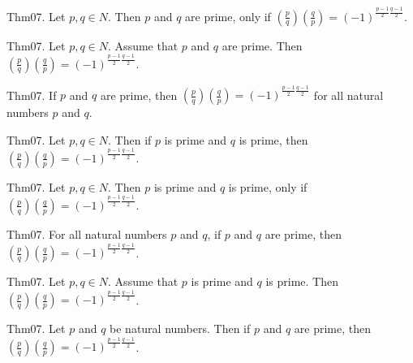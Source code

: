 \documentclass{article}
\begin{document}
Thm07. Let $p , q \in N$. Then $p$ and $q$ are prime, only if $\left(\frac{ p }{ q }\right) \left(\frac{ q }{ p }\right) = (- 1)^ {\frac{ p - 1}{2}\frac{ q - 1}{2}}$.

Thm07. Let $p , q \in N$. Assume that $p$ and $q$ are prime. Then $\left(\frac{ p }{ q }\right) \left(\frac{ q }{ p }\right) = (- 1)^ {\frac{ p - 1}{2}\frac{ q - 1}{2}}$.

Thm07. If $p$ and $q$ are prime, then $\left(\frac{ p }{ q }\right) \left(\frac{ q }{ p }\right) = (- 1)^ {\frac{ p - 1}{2}\frac{ q - 1}{2}}$ for all natural numbers $p$ and $q$.

Thm07. Let $p , q \in N$. Then if $p$ is prime and $q$ is prime, then $\left(\frac{ p }{ q }\right) \left(\frac{ q }{ p }\right) = (- 1)^ {\frac{ p - 1}{2}\frac{ q - 1}{2}}$.

Thm07. Let $p , q \in N$. Then $p$ is prime and $q$ is prime, only if $\left(\frac{ p }{ q }\right) \left(\frac{ q }{ p }\right) = (- 1)^ {\frac{ p - 1}{2}\frac{ q - 1}{2}}$.

Thm07. For all natural numbers $p$ and $q$, if $p$ and $q$ are prime, then $\left(\frac{ p }{ q }\right) \left(\frac{ q }{ p }\right) = (- 1)^ {\frac{ p - 1}{2}\frac{ q - 1}{2}}$.

Thm07. Let $p , q \in N$. Assume that $p$ is prime and $q$ is prime. Then $\left(\frac{ p }{ q }\right) \left(\frac{ q }{ p }\right) = (- 1)^ {\frac{ p - 1}{2}\frac{ q - 1}{2}}$.

Thm07. Let $p$ and $q$ be natural numbers. Then if $p$ and $q$ are prime, then $\left(\frac{ p }{ q }\right) \left(\frac{ q }{ p }\right) = (- 1)^ {\frac{ p - 1}{2}\frac{ q - 1}{2}}$.
\end{document}
